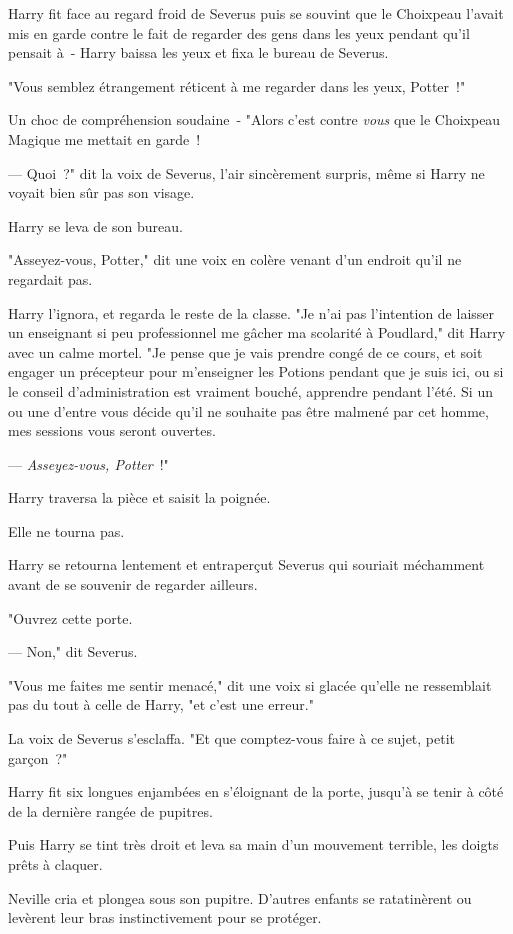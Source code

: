 Harry fit face au regard froid de Severus puis se souvint que le Choixpeau l'avait mis en garde contre le fait de regarder des gens dans les yeux pendant qu'il pensait à~- Harry baissa les yeux et fixa le bureau de Severus.

"Vous semblez étrangement réticent à me regarder dans les yeux, Potter~!"

Un choc de compréhension soudaine~- "Alors c'est contre \emph{vous} que le Choixpeau Magique me mettait en garde~!

--- Quoi~?" dit la voix de Severus, l'air sincèrement surpris, même si Harry ne voyait bien sûr pas son visage.

Harry se leva de son bureau.

"Asseyez-vous, Potter," dit une voix en colère venant d'un endroit qu'il ne regardait pas.

Harry l'ignora, et regarda le reste de la classe. "Je n'ai pas l'intention de laisser un enseignant si peu professionnel me gâcher ma scolarité à Poudlard," dit Harry avec un calme mortel. "Je pense que je vais prendre congé de ce cours, et soit engager un précepteur pour m'enseigner les Potions pendant que je suis ici, ou si le conseil d'administration est vraiment bouché, apprendre pendant l'été. Si un ou une d'entre vous décide qu'il ne souhaite pas être malmené par cet homme, mes sessions vous seront ouvertes.

--- \emph{Asseyez-vous, Potter}~!"

Harry traversa la pièce et saisit la poignée.

Elle ne tourna pas.

Harry se retourna lentement et entraperçut Severus qui souriait méchamment avant de se souvenir de regarder ailleurs.

"Ouvrez cette porte.

--- Non," dit Severus.

"Vous me faites me sentir menacé," dit une voix si glacée qu'elle ne ressemblait pas du tout à celle de Harry, "et c'est une erreur."

La voix de Severus s'esclaffa. "Et que comptez-vous faire à ce sujet, petit garçon~?"

Harry fit six longues enjambées en s'éloignant de la porte, jusqu'à se tenir à côté de la dernière rangée de pupitres.

Puis Harry se tint très droit et leva sa main d'un mouvement terrible, les doigts prêts à claquer.

Neville cria et plongea sous son pupitre. D'autres enfants se ratatinèrent ou levèrent leur bras instinctivement pour se protéger.

